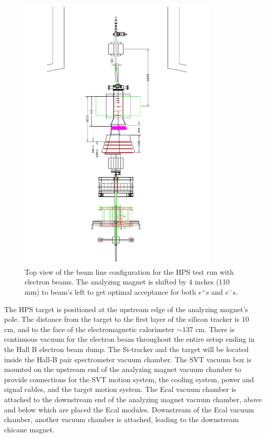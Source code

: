 \begin{figure}[t]
\includegraphics[angle=180., width=0.85\textwidth]{beamline/HPS12_66840e051XX_PLAN.pdf}
\caption{\small{Top view of the beam line configuration for the HPS test run with electron beams. The analyzing magnet is shifted by 4 inches 
(110 mm) to beam's left to get optimal acceptance for both $e^+$s and $e^-$s.}}\label{fig:ebeamt}
\end{figure}

 
The HPS target is positioned at the upstream edge of the analyzing magnet's pole. The distance from the target to the first layer of the 
silicon tracker is $10$ cm, and to the face of the electromagnetic calorimeter $\sim 137$ cm. There is continuous vacuum for the electron 
beam throughout the entire setup ending in the Hall B electron beam dump. The Si-tracker and the target will be located inside the Hall-B 
pair spectrometer vacuum chamber. The SVT vacuum box is mounted on the upstream end of the analyzing magnet vacuum chamber to provide 
connections for the SVT motion system, the cooling system, power and signal cables, and the target motion system. The Ecal vacuum chamber 
is attached to the downstream end of the analyzing magnet vacuum chamber, above and below which are placed the Ecal modules. Downstream of 
the Ecal vacuum chamber, another vacuum chamber is attached, leading to the downstream chicane magnet.

